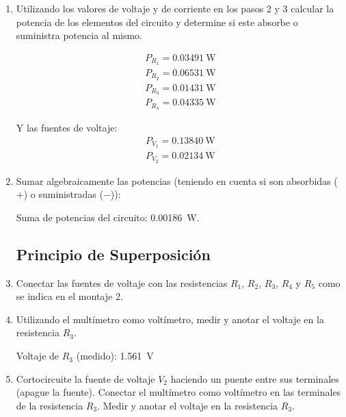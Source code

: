 \documentclass{article}
\begin{document}
\begin{enumerate}
        \item Utilizando los valores de voltaje y de corriente en los pasos 2 y 3 calcular la potencia de los elementos del circuito y determine si este absorbe o suministra potencia al mismo.
        
        \begin{align*}
            P_{R_1} = \SI{0.03491}{\watt}\\
            P_{R_2} = \SI{0.06531}{\watt}\\
            P_{R_3} = \SI{0.01431}{\watt}\\
            P_{R_4} = \SI{0.04335}{\watt}
        \end{align*}

        Y las fuentes de voltaje:
        \begin{align*}
            P_{V_1} = \SI{0.13840}{\watt}\\
            P_{V_2} = \SI{0.02134}{\watt}
        \end{align*}

        \item Sumar algebraicamente las potencias (teniendo en cuenta si son absorbidas ($+$) o suministradas ($-$)):
        
        Suma de potencias del circuito: \SI{0.00186}{\watt}.

        \subsection{Principio de Superposición}

        \item Conectar las fuentes de voltaje con las resistencias $R_1$, $R_2$, $R_3$, $R_4$ y $R_5$ como se indica en el montaje 2.
        

        \item Utilizando el multímetro como voltímetro, medir y anotar el voltaje en la resistencia $R_3$.
        
        Voltaje de $R_3$ (medido): \SI{1.561}{\volt}

        \item Cortocircuite la fuente de voltaje $V_2$ haciendo un puente entre sus terminales (apague la fuente). Conectar el multímetro como voltímetro en las terminales de la resistencia $R_3$. Medir y anotar el voltaje en la resistencia $R_3$.
        

\end{enumerate}
\end{document}
